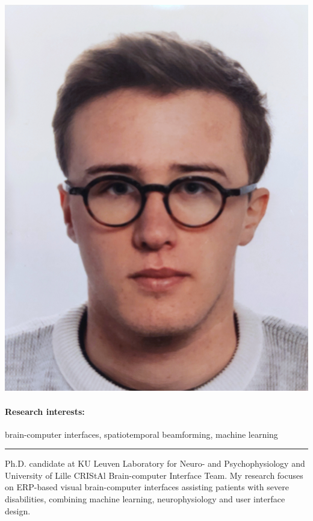 \documentclass[10pt,a4paper]{article}
\begin{document}
    \begin{minipage}{.25\linewidth}
        \includegraphics[width=\linewidth]{photo.jpg}
    \end{minipage}

    \paragraph{Research interests:} brain-computer interfaces, spatiotemporal beamforming, machine learning


    \bigskip
    \hrule
    \bigskip

    Ph.D. candidate at KU Leuven Laboratory for Neuro- and Psychophysiology and University of Lille CRIStAl
    Brain-computer Interface Team. My research focuses on ERP-based visual brain-computer interfaces
    assisting patients with severe disabilities, combining machine learning, neurophysiology and
    user interface design.
\end{document}
